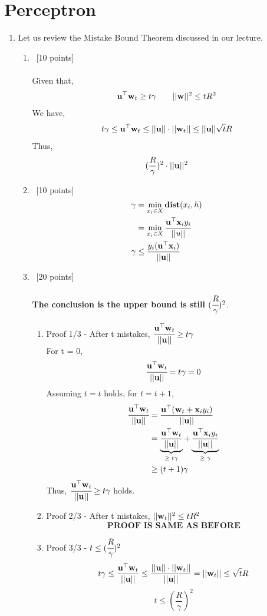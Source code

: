 \documentclass[12pt, fullpage,letterpaper]{article}
\newcommand{\bx}{{\bf x}}
\newcommand{\bw}{{\bf w}}
\newcommand{\bu}{{\bf u}}
\begin{document}
\section{Perceptron}
\begin{enumerate}
\item  Let us review the Mistake Bound Theorem discussed in our lecture. 
\begin{enumerate}
\item~[10 points]\\\\
Given that,
$$\bu^\top\bw_t\ge t\gamma \qquad ||\bw||^2\le tR^2$$
We have,
$$t\gamma \le \bu^\top\bw_t \le ||\bu||\cdot||\bw_t|| \le ||\bu||\sqrt{t}R$$
Thus,
$$(\frac{R}{\gamma})^2\cdot||\bu||^2$$
\item~[10 points]
\begin{align*}
\gamma &= \min_{x_i\in X}\mathbf{dist}(x_i, h)\\
&= \min_{x_i\in X}\frac{\bu^\top\bx_iy_i}{||u||}\\
\gamma &\le \frac{y_i(\bu^\top\bx_i)}{||\bu||}
\end{align*}
\item~[20 points]\\\\
\textbf{The conclusion is the upper bound is still $(\cfrac{R}{\gamma})^2$}.
\begin{enumerate}
\item Proof 1/3 - After t mistakes, $\cfrac{\bu^\top\bw_t}{||\bu||} \ge t\gamma$\\
For t = 0,
$$\cfrac{\bu^\top\bw_t}{||\bu||} = t\gamma = 0$$
Assuming $t=t$ holds, for $t=t+1$,
\begin{align*}
\cfrac{\bu^\top\bw_t}{||\bu||} &= \frac{\bu^\top(\bw_t+\bx_iy_i)}{||\bu||}\\
&= \underbrace{\frac{\bu^\top\bw_t}{||\bu||}}_\text{$\ge t\gamma$} + \underbrace{\frac{\bu^\top\bx_iy_i}{||\bu||}}_\text{$\ge \gamma$}\\
& \ge (t+1)\gamma
\end{align*}
Thus, $\cfrac{\bu^\top\bw_t}{||\bu||} \ge t\gamma$ holds.
\item Proof 2/3 - After t mistakes, $||\bw_t||^2 \le tR^2$
$$\textbf{PROOF IS SAME AS BEFORE}$$
\item Proof 3/3 - $t \le (\cfrac{R}{\gamma})^2$
$$t\gamma \le \frac{\bu^\top\bw_t}{||\bu||} \le \frac{||\bu||\cdot||\bw_t||}{||\bu||}=||\bw_t|| \le \sqrt{t}R$$
$$t \le (\frac{R}{\gamma})^2$$
\end{enumerate}
\end{enumerate}

\end{enumerate}
\end{document}
